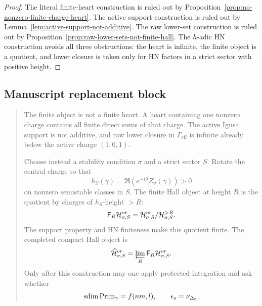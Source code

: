 \begin{proof}
The literal finite-heart construction is ruled out by
Proposition~\ref{prop:no-nonzero-finite-charge-heart}.  The active
support construction is ruled out by
Lemma~\ref{lem:active-support-not-additive}.  The raw lower-set
construction is ruled out by
Proposition~\ref{prop:raw-lower-sets-not-finite-hall}.  The
\(h\)-adic HN construction avoids all three obstructions: the heart is
infinite, the finite object is a quotient, and lower closure is taken
only for HN factors in a strict sector with positive height.
\end{proof}

\subsection{Manuscript replacement block}

\begin{quote}
The finite object is not a finite heart.  A heart containing one
nonzero charge contains all finite direct sums of that charge.  The
active Igusa support is not additive, and raw lower closure in
\(\Gamma_{\mathrm{eff}}\) is infinite already below the active charge
\((1,0,1)\).

Choose instead a stability condition \(\sigma\) and a strict sector
\(S\).  Rotate the central charge so that
\[
  h_S(\gamma)=\Re(e^{-i\vartheta}Z_\sigma(\gamma))>0
\]
on nonzero semistable classes in \(S\).  The finite Hall object at
height \(R\) is the quotient by charges of \(h_S\)-height \(>R\):
\[
  \mathsf F_R\mathcal H_{\sigma,S}^{or}
  =
  \mathcal H_{\sigma,S}^{or}/\mathcal H_{\sigma,S}^{>R}.
\]
The support property and HN finiteness make this quotient finite.  The
completed compact Hall object is
\[
  \widehat{\mathcal H}_{\sigma,S}^{or}
  =
  \varprojlim_R \mathsf F_R\mathcal H_{\sigma,S}^{or}.
\]
Only after this construction may one apply protected integration and
ask whether
\[
  \operatorname{sdim}\operatorname{Prim}_\gamma=f(nm,l),\qquad
  \epsilon_o=\nu_{\Delta_5}.
\]
\end{quote}
